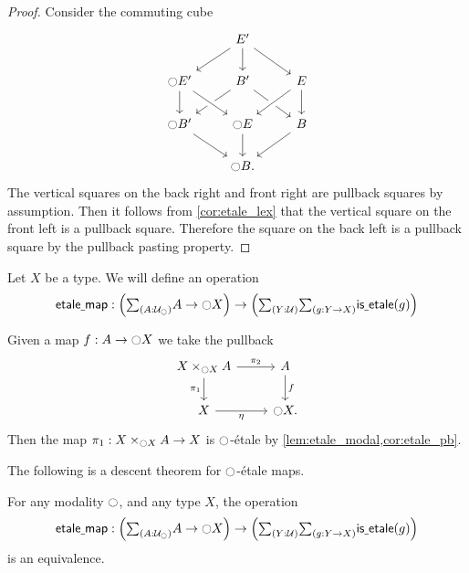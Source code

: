 \documentclass[9pt,twosided]{amsart}
\begin{document}
\begin{proof}
Consider the commuting cube
\begin{equation*}
\begin{tikzcd}
&[-.5ex] E' \arrow[dr] \arrow[d] \arrow[dl] \\
\modal E' \arrow[d] & B' \arrow[dl] \arrow[dr] & E \arrow[dl,crossing over] \arrow[d] \\
\modal B' \arrow[dr] & \modal E \arrow[d] \arrow[from=ul,crossing over] & B \arrow[dl] \\
& \modal B.
\end{tikzcd}
\end{equation*}
The vertical squares on the back right and front right are pullback squares by assumption.
Then it follows from \cref{cor:etale_lex} that the vertical square on the front left is a pullback square.
Therefore the square on the back left is a pullback square by the pullback pasting property.
\end{proof}

\begin{defn}
Let $X$ be a type. We will define an operation
\begin{equation*}
\etmap:\Big(\sm{A:\UU_\modal}A\to\modal X\Big)\to\Big(\sm{Y:\UU}{g:Y\to X}\isetale(g)\Big)
\end{equation*}
\end{defn}

\begin{constr}
Given a map $f:A\to {\ensuremath{\ocircle}} X$ we take the pullback
\begin{equation*}
\begin{tikzcd}
X\times_{\modal X}A \arrow[d,swap,"\pi_1"] \arrow[r,"\pi_2"] & A \arrow[d,"f"] \\
X \arrow[r,swap,"\modalunit"] & \modal X.
\end{tikzcd}
\end{equation*}
Then the map $\pi_1:X\times_{{\ocircle} X}A\to X$ is ${\ocircle}$-\'etale by \cref{lem:etale_modal,cor:etale_pb}.
\end{constr}

The following is a descent theorem for ${\ocircle}$-\'etale maps.

\begin{thm}\label{thm:modal_descent}
For any modality ${\ocircle}$, and any type $X$, the operation
\begin{equation*}
\etmap:\Big(\sm{A:\UU_\modal}A\to\modal X\Big)\to\Big(\sm{Y:\UU}{g:Y\to X}\isetale(g)\Big)
\end{equation*}
is an equivalence.
\end{thm}
\end{document}

